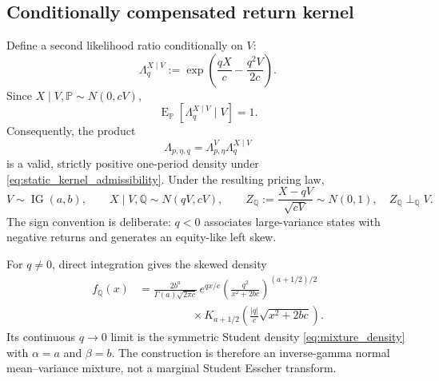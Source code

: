 \documentclass[11pt,a4paper]{article}
\DeclareMathOperator{\IG}{IG}
\DeclareMathOperator{\E}{E}
\begin{document}
\subsection{Conditionally compensated return kernel}

Define a second likelihood ratio conditionally on $V$:
\begin{equation}
  \Lambda_q^{X\mid V}
  :=
  \exp\left(\frac{qX}{c}-\frac{q^2V}{2c}\right).
  \label{eq:conditional_return_kernel}
\end{equation}
Since $X\mid V,\mathbb P\sim N(0,cV)$,
\begin{equation}
  \E_{\mathbb P}[\Lambda_q^{X\mid V}\mid V]=1.
\end{equation}
Consequently, the product
\begin{equation}
  \Lambda_{p,\eta,q}
  =\Lambda_{p,\eta}^{V}\Lambda_q^{X\mid V}
  \label{eq:combined_pricing_kernel}
\end{equation}
is a valid, strictly positive one-period density under
\eqref{eq:static_kernel_admissibility}.  Under the resulting pricing law,
\begin{equation}
  V\sim\IG(a,b),\qquad
  X\mid V,\mathbb Q\sim N(qV,cV),
  \qquad
  Z_{\mathbb Q}:=\frac{X-qV}{\sqrt{cV}}\sim N(0,1),
  \quad Z_{\mathbb Q}\perp_{\mathbb Q}V.
  \label{eq:q_joint_law}
\end{equation}
The sign convention is deliberate: $q<0$ associates large-variance states
with negative returns and generates an equity-like left skew.

For $q\ne0$, direct integration gives the skewed density
\begin{align}
  f_{\mathbb Q}(x)
  &=
  \frac{2b^a}{\Gamma(a)\sqrt{2\pi c}}\,
  e^{qx/c}
  \left(\frac{q^2}{x^2+2bc}\right)^{(a+1/2)/2}
  \nonumber\\
  &\hspace{2cm}\times
  K_{a+1/2}\left(
    \frac{|q|}{c}\sqrt{x^2+2bc}
  \right).
  \label{eq:skew_t_density}
\end{align}
Its continuous $q\to0$ limit is the symmetric Student density
\eqref{eq:mixture_density} with $\alpha=a$ and $\beta=b$.  The construction is therefore an
inverse-gamma normal mean--variance mixture, not a marginal Student Esscher
transform.
\end{document}

